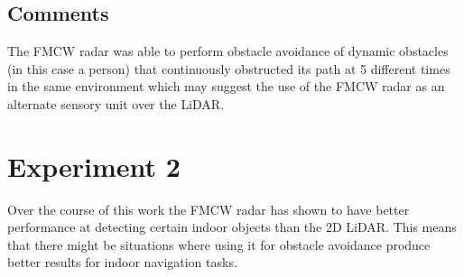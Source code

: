 \subsection{Comments}
 The \ac{FMCW} radar was able to perform 
obstacle avoidance of dynamic obstacles (in this case a person) that continuously obstructed its path at 5 different times in the same environment which may suggest the use of the \ac{FMCW} \ac{radar} as an alternate sensory unit over the \ac{LiDAR}.


\section {Experiment 2}
Over the course of this work the \ac{FMCW} radar has shown to have better performance at detecting certain indoor objects than the 2D \ac{LiDAR}. This means that there might be situations where using it for obstacle avoidance produce better results for indoor navigation tasks. \\

